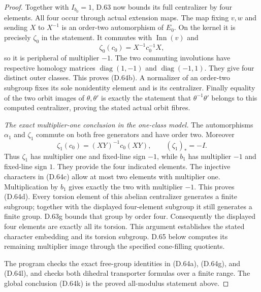 \begin{proof}
Together with $I_{b_0}=1$, D.63 now bounds its
full centralizer by four elements.
All four occur through actual extension maps.
The map fixing $v,w$ and sending $X$ to $X^{-1}$
is an order-two automorphism of $E_0$.
On the kernel it is precisely $\zeta_0$ in
the statement.
It commutes with $\operatorname{Inn}(v)$ and
\[
                 \zeta_0(c_0)=X^{-1}c_0^{-1}X,
\]
so it is peripheral of multiplier $-1$.
The two commuting involutions have respective
homology matrices
$\operatorname{diag}(1,-1)$ and
$\operatorname{diag}(-1,1)$.
They give four distinct outer classes.
This proves (D.64b).
A normalizer of an order-two subgroup fixes its
sole nonidentity element and is its centralizer.
Finally equality of the two orbit images of
$\theta,\theta'$ is exactly the statement that
$\theta^{-1}\theta'$ belongs to this computed
centralizer, proving the stated actual orbit fibres.

\emph{The exact multiplier-one conclusion in the one-class model.}
The automorphisms $\alpha_1$ and $\zeta_1$ commute
on both free generators and have order two.
Moreover
\[
        \zeta_1(c_0)=(XY)^{-1}c_0(XY),
        \qquad (\zeta_1)_*=-I .
                                                               \tag{D.64l}
\]
Thus $\zeta_1$ has multiplier one and fixed-line
sign $-1$, while $b_1$ has multiplier $-1$
and fixed-line sign $1$.
They provide the four indicated elements.
The injective characters in (D.64c) allow at
most two elements with multiplier one.
Multiplication by $b_1$ gives exactly the two
with multiplier $-1$.
This proves (D.64d).
Every torsion element of this abelian centralizer
generates a finite subgroup; together with the
displayed four-element subgroup it still generates
a finite group.
D.63g bounds that group by order four.
Consequently the displayed four elements are
exactly all its torsion.
This argument establishes the stated character
embedding and its torsion subgroup. D.65 below
computes its remaining multiplier image through
the specified cone-filling quotients.

The program
checks the exact free-group identities in
(D.64a), (D.64g), and (D.64l), and checks both
dihedral transporter formulas over a finite range.
The global conclusion (D.64k) is the proved
all-modulus statement above.
\end{proof}
